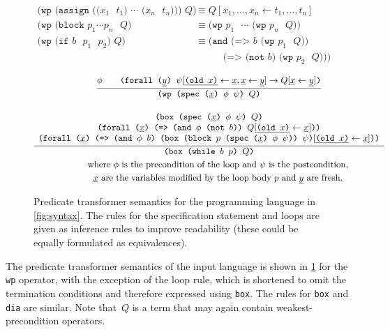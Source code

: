 \documentclass[fleqn]{llncs}
\newcommand{\code}[1]{\texttt{#1}}
\newcommand{\xs}{\underline x}
\newcommand{\ys}{\underline y}
\begin{document}
\begin{figure}[t]
    \begin{align*}
\code{(wp (assign (($x_1$ $t_1$) $\cdots$ ($x_n$ $t_n$))) $Q$)}
    & \equiv Q[x_1,\ldots,x_n \gets t_1,\ldots,t_n]
    \\
\code{(wp (block $p_1 \cdots p_n$ $Q$)}
    & \equiv \code{(wp $p_1$ $\cdots$ (wp $p_n$ $Q$))}
    \\
\code{(wp (if $b$ $p_1$ $p_2$) $Q$)}
    & \equiv        \code{(and (=> $b$ (wp $p_1$ $Q$))} \\
    & \hspace{30pt} \code{     (=> (not $b$) (wp $p_2$ $Q$)))}
    \end{align*}

    \begin{gather*}
\infer{\code{(wp (spec ($\xs$) $\phi$ $\psi$) $Q$)}}
{   \phi
 && \code{(forall ($\ys$) $\psi[\underline{\code{(old $x$)}} \gets \xs, \xs \gets \ys]
                            \to Q[\xs \gets \ys]$)}
              }
    \\[1em]
\infer{\code{(box (while $b$ $p$) $Q$)}}
{   
\begin{array}{c}
   \code{(box (spec ($\xs$) $\phi$ $\psi$) $Q$)} \\
   \code{(forall ($\xs$) (=> (and $\phi$ (not $b$)) $Q[\underline{\code{(old $x$)}} \gets \xs]$))} \\
   \code{(forall ($\xs$) (=> (and $\phi$ $b$) (box (block $p$ (spec ($\xs$) $\phi$ $\psi$)) $\psi$)$[\underline{\code{(old $x$)}} \gets \xs]$))}
\end{array}}
    \\
        \qquad \text{where $\phi$ is the precondition of the loop and $\psi$ is the postcondition,} \\
        \qquad \text{$\xs$ are the variables modified by the loop body~$p$ and $\ys$ are fresh.}
    \end{gather*}
    \caption{Predicate transformer semantics for the programming language in \cref{fig:syntax}.
             The rules for the specification statement and loops are given as inference rules
             to improve readability (these could be equally formulated as equivalences).}
    \label{fig:semantics}
\end{figure}

The predicate transformer semantics of the input language is shown in \cref{fig:semantics} for the \code{wp} operator,
with the exception of the loop rule, which is shortened to omit the termination conditions
and therefore expressed using \code{box}. The rules for \code{box} and \code{dia} are similar.
Note that~$Q$ is a term that may again contain weakest-precondition operators.
\end{document}
